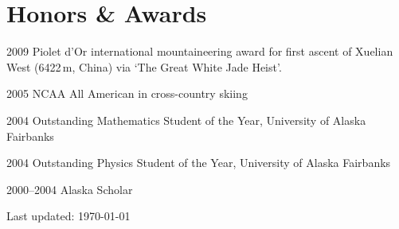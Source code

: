 \documentclass[10pt,letterpaper]{article}
\renewenvironment{itemize}{
  \begin{list}{}{
    \setlength{\leftmargin}{1.5em}
    \setlength{\itemsep}{0.25em}
    \setlength{\parskip}{0pt}
    \setlength{\parsep}{0.25em}
  }
}{
  \end{list}
}
\begin{document}
\section*{Honors \& Awards}
\begin{itemize}
\item 2009 Piolet d'Or international mountaineering award for first ascent of Xuelian West (6422\,m, China) via `The Great White Jade Heist'.
\item 2005 NCAA All American in cross-country skiing
\item 2004 Outstanding Mathematics Student of the Year, University of Alaska Fairbanks
\item 2004 Outstanding Physics Student of the Year, University of Alaska Fairbanks
\item 2000--2004 Alaska Scholar
\end{itemize}

\begin{center}
  \begin{small}
    Last updated: \today
  \end{small}
\end{center}
\end{document}
